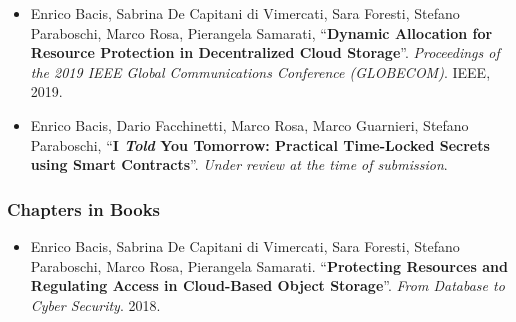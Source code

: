 {\begin{itemize}
	
	\item Enrico Bacis, Sabrina De Capitani di Vimercati, Sara Foresti, Stefano Paraboschi, Marco Rosa, Pierangela Samarati, ``\textbf{Dynamic Allocation for Resource Protection in Decentralized Cloud Storage}''. {\em Proceedings of the 2019 IEEE Global Communications Conference (GLOBECOM)}. IEEE, 2019.
	
	\item Enrico Bacis, Dario Facchinetti, Marco Rosa, Marco Guarnieri, Stefano Paraboschi, ``\textbf{I {\em Told} You Tomorrow: Practical Time-Locked Secrets using Smart Contracts}''. {\em Under review at the time of submission}.
\end{itemize}

\subsubsection*{Chapters in Books}
\begin{itemize}
	\item  Enrico Bacis,	Sabrina De Capitani di Vimercati, Sara Foresti,	Stefano Paraboschi,	Marco Rosa,	Pierangela Samarati. ``\textbf{Protecting Resources and Regulating Access in Cloud-Based Object Storage}''. {\em From Database to Cyber Security}. 2018.
\end{itemize}

} %